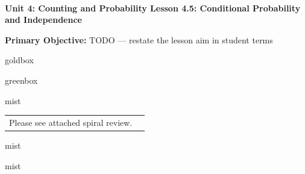 \documentclass[10pt]{article}
\newcommand{\UnitNumberName}{Unit 4: Counting and Probability \quad}
\newcommand{\LessonNumberName}{Lesson 4.5: Conditional Probability and Independence}
\begin{document}
\begin{center}
    {\Large\bfseries \CourseName \\
    {\small\bfseries \UnitNumberName \LessonNumberName}}
\end{center}

\begin{tcolorbox}[colback=mist, colframe=royal, boxrule=0.9pt, arc=2mm,
    left=2mm, right=2mm, top=1.5mm, bottom=1.5mm]
    \textbf{Primary Objective:} TODO --- restate the lesson aim in student terms
\end{tcolorbox}

\renewcommand{\arraystretch}{1.6}
\begin{skillbox}{goldbox}
\end{skillbox}

\begin{skillbox}{greenbox}
\end{skillbox}

\begin{fixedskillbox}{mist}
    \begin{tabularx}{\linewidth}{@{}X c@{}}
        \begin{minipage}[t]{0.55\linewidth}\vspace{0pt}
            Please see attached spiral review.  %
        \end{minipage}
        &
        \begin{minipage}[t]{0.38\linewidth}\vspace{0pt}\centering
        \end{minipage}
    \end{tabularx}
\end{fixedskillbox}

\begin{skillbox}[Hook]{mist}
\end{skillbox}

\begin{skillbox}[Lesson]{mist}
\end{skillbox}
\end{document}
